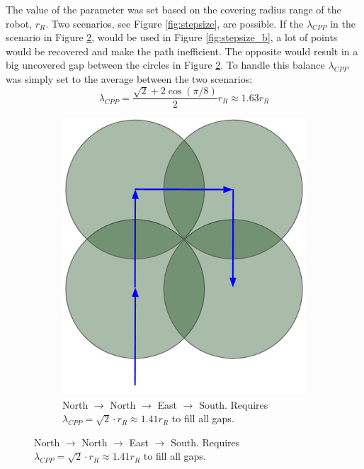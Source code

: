 The value of the parameter was set based on the covering radius range of the robot, $r_R$. Two scenarios, see Figure \ref{fig:stepsize}, are possible. If the $\lambda_{CPP}$ in the scenario in Figure \ref{fig:stepsize_a}, would be used in Figure \ref{fig:stepsize_b}, a lot of points would be recovered and make the path inefficient. The opposite would result in a big uncovered gap between the circles in Figure \ref{fig:stepsize_a}. To handle this balance $\lambda_{CPP}$ was simply set to the average between the two scenarios:
\begin{equation}
    \lambda_{CPP} = \frac{\sqrt{2}+2\cos(\pi/8)}{2}r_R \approx 1.63r_R
    \label{eq:lambda_cpp}
\end{equation}


\begin{figure}
\centering
    \begin{subfigure}{0.4\textwidth}
    \centering
    \includegraphics[width=\textwidth]{figures/stepsize_a.png}
    \caption{North $\rightarrow$ North $\rightarrow$ East $\rightarrow$ South. Requires $\lambda_{CPP} = \sqrt{2} \cdot r_R \approx 1.41r_R$ to fill all gaps.}
    \label{fig:stepsize_a}
    \end{subfigure}\hspace{0.1\textwidth}

\end{figure}
